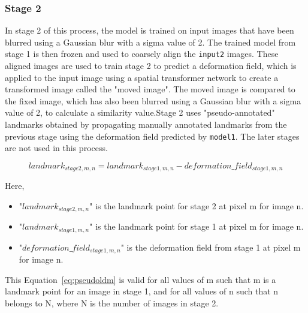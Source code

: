 \documentclass{book}
\begin{document}
	\subsubsection{Stage 2}
	In stage 2 of this process, the model is trained on input images that have been blurred using a Gaussian blur with a sigma value of 2. The trained model from stage 1 is then frozen and used to coarsely align the \texttt{input2} images. These aligned images are used to train stage 2 to predict a deformation field, which is applied to the input image using a spatial transformer network to create a transformed image called the "moved image". The moved image is compared to the fixed image, which has also been blurred using a Gaussian blur with a sigma value of 2, to calculate a similarity value.Stage 2 uses "pseudo-annotated" landmarks obtained by propagating manually annotated landmarks from the previous stage using the deformation field predicted by \texttt{model1}. The later stages are not used in this process.
	
	\begin{equation}\label{eq:pseudoldm}
		landmark_{stage2,m,n} = landmark_{stage1,m,n} - deformation\_field_{stage1,m,n}
	\end{equation}
	
	Here, 
	\begin{itemize}
		\item "$landmark_{stage2,m,n}$" is the landmark point for stage 2 at pixel m for image n.
		\item "$landmark_{stage1,m,n}$" is the landmark point for stage 1 at pixel m for image n.
		\item "$deformation\_field_{stage1,m,n}$" is the deformation field from stage 1 at pixel m for image n.    
	\end{itemize}
	
	This Equation~\ref{eq:pseudoldm} is valid for all values of m such that m is a landmark point for an image in stage 1, and for all values of n such that n belongs to N, where N is the number of images in stage 2.
\end{document}
